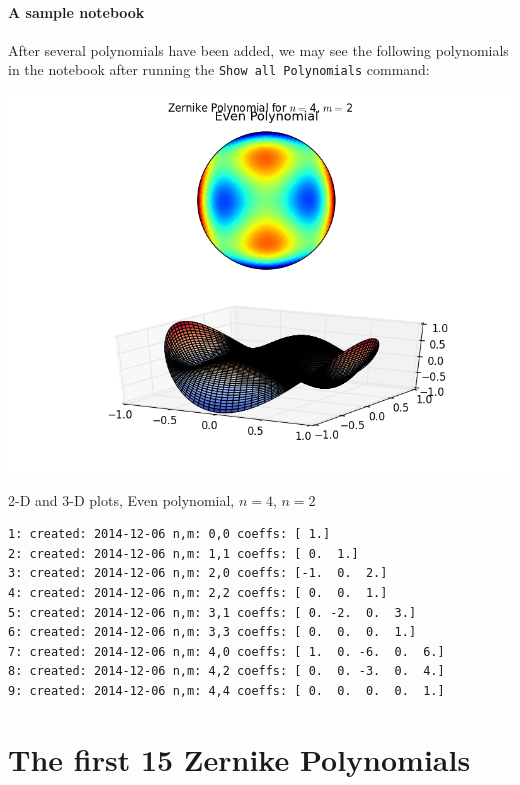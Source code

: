 \documentclass{tufte-handout}
\begin{document}
\paragraph{A sample notebook}
After several polynomials have been added, we may see the following polynomials in the notebook after running the \Verb|Show all Polynomials| command:

\begin{marginfigure}[10mm]%
  \includegraphics[width=\linewidth]{img/4-2-compare-even.png}
  \caption{2-D and 3-D plots, Even polynomial, $n=4$, $n=2$}
\end{marginfigure}

\begin{verbatim}
1: created: 2014-12-06 n,m: 0,0 coeffs: [ 1.]
2: created: 2014-12-06 n,m: 1,1 coeffs: [ 0.  1.]
3: created: 2014-12-06 n,m: 2,0 coeffs: [-1.  0.  2.]
4: created: 2014-12-06 n,m: 2,2 coeffs: [ 0.  0.  1.]
5: created: 2014-12-06 n,m: 3,1 coeffs: [ 0. -2.  0.  3.]
6: created: 2014-12-06 n,m: 3,3 coeffs: [ 0.  0.  0.  1.]
7: created: 2014-12-06 n,m: 4,0 coeffs: [ 1.  0. -6.  0.  6.]
8: created: 2014-12-06 n,m: 4,2 coeffs: [ 0.  0. -3.  0.  4.]
9: created: 2014-12-06 n,m: 4,4 coeffs: [ 0.  0.  0.  0.  1.]
\end{verbatim}

\pagebreak

\section{The first 15 Zernike Polynomials}
\end{document}
